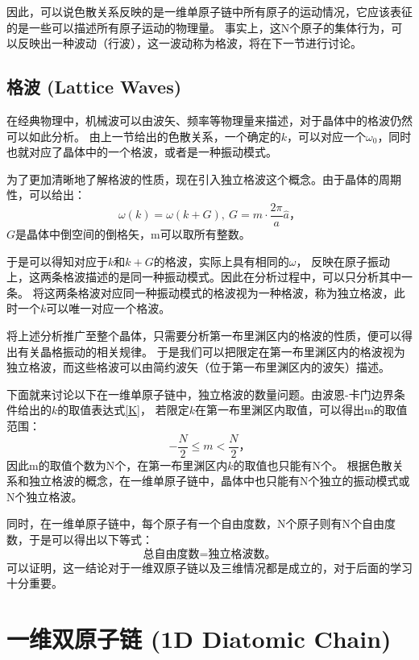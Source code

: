 \documentclass[declarePage]{ecnuthesis}
\begin{document}
因此，可以说色散关系反映的是一维单原子链中所有原子的运动情况，它应该表征的是一些可以描述所有原子运动的物理量。%
事实上，这N个原子的集体行为，可以反映出一种波动（行波），这一波动称为格波，将在下一节进行讨论。

\subsection{格波 (Lattice Waves)} \label{LW}

在经典物理中，机械波可以由波矢、频率等物理量来描述，对于晶体中的格波仍然可以如此分析。%
由上一节给出的色散关系，一个确定的$k$，可以对应一个$\omega_0$，同时也就对应了晶体中的一个格波，或者是一种振动模式。

为了更加清晰地了解格波的性质，现在引入独立格波这个概念。由于晶体的周期性，可以给出：
\begin{equation}
    \omega(k) = \omega(k+G),\ G=m \cdot \frac{2\pi}{a}\hat{a} \text{，}
\end{equation}
$G$是晶体中倒空间的倒格矢，m可以取所有整数。

于是可以得知对应于$k$和$k+G$的格波，实际上具有相同的$\omega$，%
反映在原子振动上，这两条格波描述的是同一种振动模式。因此在分析过程中，可以只分析其中一条。%
将这两条格波对应同一种振动模式的格波视为一种格波，称为独立格波，此时一个$k$可以唯一对应一个格波。

将上述分析推广至整个晶体，只需要分析第一布里渊区内的格波的性质，便可以得出有关晶格振动的相关规律。%
于是我们可以把限定在第一布里渊区内的格波视为独立格波，而这些格波可以由简约波矢（位于第一布里渊区内的波矢）描述。

下面就来讨论以下在一维单原子链中，独立格波的数量问题。由波恩-卡门边界条件给出的$k$的取值表达式\ref{K}，%
若限定$k$在第一布里渊区内取值，可以得出m的取值范围：
\begin{equation}
    -\frac{N}{2} \le m < \frac{N}{2} \text{，}
\end{equation}
因此m的取值个数为N个，在第一布里渊区内$k$的取值也只能有N个。
根据色散关系和独立格波的概念，在一维单原子链中，晶体中也只能有N个独立的振动模式或N个独立格波。

同时，在一维单原子链中，每个原子有一个自由度数，N个原子则有N个自由度数，于是可以得出以下等式：
\begin{equation}
    \text{总自由度数}=\text{独立格波数} \text{。}
\end{equation}
可以证明，这一结论对于一维双原子链以及三维情况都是成立的，对于后面的学习十分重要。

\section{一维双原子链 (1D Diatomic Chain)}
\end{document}
